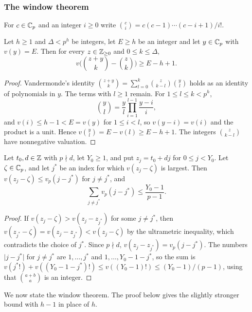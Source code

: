 \subsubsection{The window theorem}

For $c\in\mathbb C_p$ and an integer $i\ge0$ write $\binom ci=c(c-1)\cdots(c-i+1)/i!$.

\begin{lemma}\label{w1:lem:binshift}
Let $h\ge1$ and $\Delta<p^h$ be integers, let $E\ge h$ be an integer and let $y\in\mathbb C_p$ with $v(y)=E$. Then for every $z\in\mathbb Z_{\ge0}$ and $0\le k\le\Delta$,
\[
v\Big(\binom{z+y}k-\binom zk\Big)\ge E-h+1 .
\]
\end{lemma}

\begin{proof}
Vandermonde's identity $\binom{z+y}k=\sum_{l=0}^k\binom z{k-l}\binom yl$ holds as an identity of polynomials in $y$. The terms with $l\ge1$ remain. For $1\le l\le k<p^h$,
\[
\binom yl=\frac yl\prod_{i=1}^{l-1}\frac{y-i}{i},
\]
and $v(i)\le h-1<E=v(y)$ for $1\le i<l$, so $v(y-i)=v(i)$ and the product is a unit. Hence $v\binom yl=E-v(l)\ge E-h+1$. The integers $\binom z{k-l}$ have nonnegative valuation.
\end{proof}

\begin{lemma}\label{w1:lem:closest}
Let $t_0,d\in\mathbb Z$ with $p\nmid d$, let $Y_0\ge1$, and put $z_j=t_0+dj$ for $0\le j<Y_0$. Let $\zeta\in\mathbb C_p$, and let $j^*$ be an index for which $v(z_{j}-\zeta)$ is largest. Then $v(z_j-\zeta)\le v_p(j-j^*)$ for $j\ne j^*$, and
\[
\sum_{j\ne j^*}v_p(j-j^*)\le\frac{Y_0-1}{p-1}.
\]
\end{lemma}

\begin{proof}
If $v(z_j-\zeta)>v(z_j-z_{j^*})$ for some $j\ne j^*$, then $v(z_{j^*}-\zeta)=v(z_j-z_{j^*})<v(z_j-\zeta)$ by the ultrametric inequality, which contradicts the choice of $j^*$. Since $p\nmid d$, $v(z_j-z_{j^*})=v_p(j-j^*)$. The numbers $\lvert j-j^*\rvert$ for $j\ne j^*$ are $1,\dots,j^*$ and $1,\dots,Y_0-1-j^*$, so the sum is $v(j^*!)+v((Y_0-1-j^*)!)\le v((Y_0-1)!)\le(Y_0-1)/(p-1)$, using that $\binom{a+b}a$ is an integer.
\end{proof}

We now state the window theorem. The proof below gives the slightly stronger bound with $h-1$ in place of $h$.

